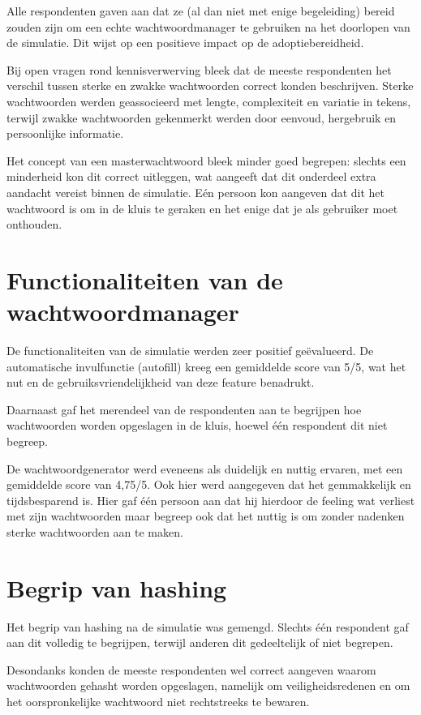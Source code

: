 Alle respondenten gaven aan dat ze (al dan niet met enige begeleiding) bereid zouden zijn om een echte wachtwoordmanager te gebruiken na het doorlopen van de simulatie. Dit wijst op een positieve impact op de adoptiebereidheid.

Bij open vragen rond kennisverwerving bleek dat de meeste respondenten het verschil tussen sterke en zwakke wachtwoorden correct konden beschrijven. Sterke wachtwoorden werden geassocieerd met lengte, complexiteit en variatie in tekens, terwijl zwakke wachtwoorden gekenmerkt werden door eenvoud, hergebruik en persoonlijke informatie.

Het concept van een masterwachtwoord bleek minder goed begrepen: slechts een minderheid kon dit correct uitleggen, wat aangeeft dat dit onderdeel extra aandacht vereist binnen de simulatie. Eén persoon kon aangeven dat dit het wachtwoord is om in de kluis te geraken en het enige dat je als gebruiker moet onthouden.

\section{Functionaliteiten van de wachtwoordmanager}

De functionaliteiten van de simulatie werden zeer positief geëvalueerd. De automatische invulfunctie (autofill) kreeg een gemiddelde score van 5/5, wat het nut en de gebruiksvriendelijkheid van deze feature benadrukt. 

Daarnaast gaf het merendeel van de respondenten aan te begrijpen hoe wachtwoorden worden opgeslagen in de kluis, hoewel één respondent dit niet begreep.

De wachtwoordgenerator werd eveneens als duidelijk en nuttig ervaren, met een gemiddelde score van 4,75/5. Ook hier werd aangegeven dat het gemmakkelijk en tijdsbesparend is. Hier gaf één persoon aan dat hij hierdoor de feeling wat verliest met zijn wachtwoorden maar begreep ook dat het nuttig is om zonder nadenken sterke wachtwoorden aan te maken.

\section{Begrip van hashing}

Het begrip van hashing na de simulatie was gemengd. Slechts één respondent gaf aan dit volledig te begrijpen, terwijl anderen dit gedeeltelijk of niet begrepen.

Desondanks konden de meeste respondenten wel correct aangeven waarom wachtwoorden gehasht worden opgeslagen, namelijk om veiligheidsredenen en om het oorspronkelijke wachtwoord niet rechtstreeks te bewaren.

